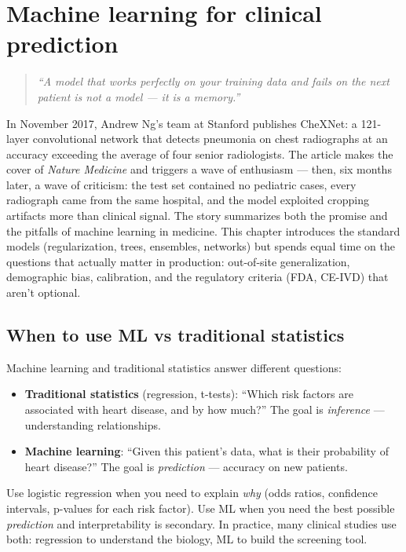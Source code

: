 \chapter{Machine learning for clinical prediction}
\label{ch:ml-clinical}

\begin{quote}
\emph{``A model that works perfectly on your training data and fails on the next patient is not a model --- it is a memory.''}
\end{quote}

In November 2017, Andrew Ng's team at Stanford publishes CheXNet: a 121-layer convolutional network that detects pneumonia on chest radiographs at an accuracy exceeding the average of four senior radiologists. The article makes the cover of \emph{Nature Medicine} and triggers a wave of enthusiasm --- then, six months later, a wave of criticism: the test set contained no pediatric cases, every radiograph came from the same hospital, and the model exploited cropping artifacts more than clinical signal. The story summarizes both the promise and the pitfalls of machine learning in medicine. This chapter introduces the standard models (regularization, trees, ensembles, networks) but spends equal time on the questions that actually matter in production: out-of-site generalization, demographic bias, calibration, and the regulatory criteria (FDA, CE-IVD) that aren't optional.

\section{When to use ML vs traditional statistics}

Machine learning and traditional statistics answer different questions:

\begin{itemize}
  \item \textbf{Traditional statistics} (regression, t-tests): ``Which risk factors are associated with heart disease, and by how much?'' The goal is \emph{inference} --- understanding relationships.
  \item \textbf{Machine learning}: ``Given this patient's data, what is their probability of heart disease?'' The goal is \emph{prediction} --- accuracy on new patients.
\end{itemize}

\begin{clinicalnote}
Use logistic regression when you need to explain \emph{why} (odds ratios, confidence intervals, p-values for each risk factor). Use ML when you need the best possible \emph{prediction} and interpretability is secondary. In practice, many clinical studies use both: regression to understand the biology, ML to build the screening tool.
\end{clinicalnote}

